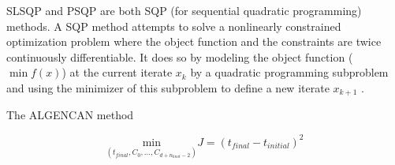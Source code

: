 SLSQP and PSQP are both SQP (for sequential quadratic programming) methods. A SQP method attempts to solve a nonlinearly constrained optimization problem where the object function and the constraints are twice continuously differentiable. It does so by modeling the object function ($\min f(x)$) at the current iterate $x_k$ by a quadratic programming subproblem and using the minimizer of this subproblem to define a new iterate $x_{k+1}$ \cite{Nocedal}.

The ALGENCAN method








\begin{equation}
	\underset{(t_{final},C_0,\dotsc,C_{d+n_{knot}-2})}{\mathrm{min}} J = (t_{final}-t_{initial})^{2}
\end{equation}

